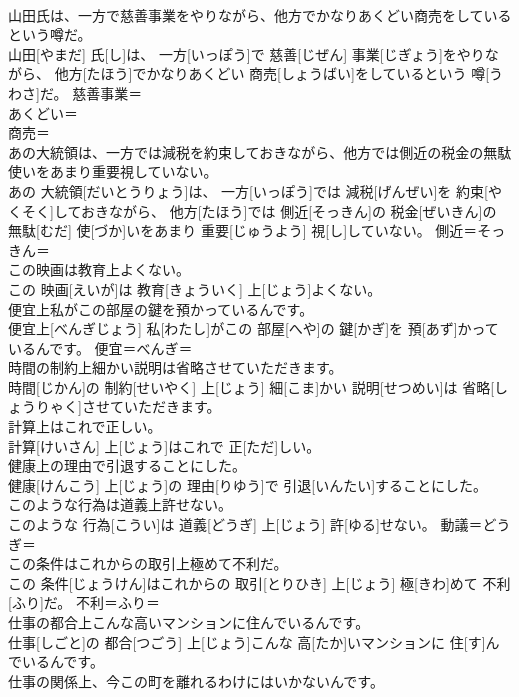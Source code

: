 \documentclass[8pt]{extreport}
\begin{document}
\begin{CJK}{UTF8}{min}
\\	山田氏は、一方で慈善事業をやりながら、他方でかなりあくどい商売をしているという噂だ。	
\\	山田[やまだ] 氏[し]は、 一方[いっぽう]で 慈善[じぜん] 事業[じぎょう]をやりながら、 他方[たほう]でかなりあくどい 商売[しょうばい]をしているという 噂[うわさ]だ。	慈善事業＝ 
\\	あくどい＝ 
\\	商売＝ 
\\	あの大統領は、一方では減税を約束しておきながら、他方では側近の税金の無駄使いをあまり重要視していない。	
\\	あの 大統領[だいとうりょう]は、 一方[いっぽう]では 減税[げんぜい]を 約束[やくそく]しておきながら、 他方[たほう]では 側近[そっきん]の 税金[ぜいきん]の 無駄[むだ] 使[づか]いをあまり 重要[じゅうよう] 視[し]していない。	側近＝そっきん＝ 
\\	この映画は教育上よくない。	
\\	この 映画[えいが]は 教育[きょういく] 上[じょう]よくない。	
\\	便宜上私がこの部屋の鍵を預かっているんです。	
\\	便宜上[べんぎじょう] 私[わたし]がこの 部屋[へや]の 鍵[かぎ]を 預[あず]かっているんです。	便宜＝べんぎ＝ 
\\	時間の制約上細かい説明は省略させていただきます。	
\\	時間[じかん]の 制約[せいやく] 上[じょう] 細[こま]かい 説明[せつめい]は 省略[しょうりゃく]させていただきます。	
\\	計算上はこれで正しい。	
\\	計算[けいさん] 上[じょう]はこれで 正[ただ]しい。	
\\	健康上の理由で引退することにした。	
\\	健康[けんこう] 上[じょう]の 理由[りゆう]で 引退[いんたい]することにした。	
\\	このような行為は道義上許せない。	
\\	このような 行為[こうい]は 道義[どうぎ] 上[じょう] 許[ゆる]せない。	動議＝どうぎ＝ 
\\	この条件はこれからの取引上極めて不利だ。	
\\	この 条件[じょうけん]はこれからの 取引[とりひき] 上[じょう] 極[きわ]めて 不利[ふり]だ。	不利＝ふり＝ 
\\	仕事の都合上こんな高いマンションに住んでいるんです。	
\\	仕事[しごと]の 都合[つごう] 上[じょう]こんな 高[たか]いマンションに 住[す]んでいるんです。	
\\	仕事の関係上、今この町を離れるわけにはいかないんです。	

\end{CJK}
\end{document}
